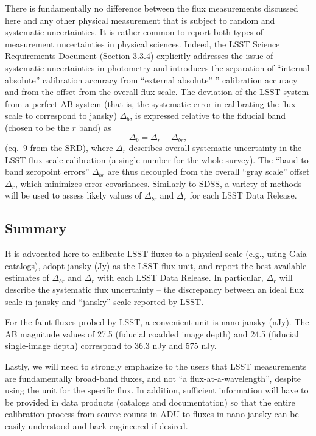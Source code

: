 \documentclass[PST,toc]{lsstdoc}
\begin{document}
There is fundamentally no difference between the flux measurements discussed
here and any other physical measurement that is subject to random and systematic
uncertainties. It is rather common to report both types of measurement uncertainties
in physical sciences. Indeed, the LSST  Science Requirements Document (Section 3.3.4)
explicitly addresses the issue of systematic uncertainties in photometry and
introduces the separation of ``internal absolute'' calibration accuracy
from ``external absolute'' ” calibration accuracy and from the offset from the
overall flux scale. The deviation of the LSST system from a perfect AB system
(that is, the systematic error in calibrating the flux scale to correspond to jansky)
$\Delta_b$, is expressed relative to the fiducial band (chosen to be the $r$ band)
as \begin{equation}
             \Delta_b = \Delta_r + \Delta_{br},
\end{equation}
(eq.~9 from the SRD), where $\Delta_r$ describes overall systematic uncertainty
in the LSST flux scale calibration (a single number for the whole survey). The
``band-to-band zeropoint errors'' $\Delta_{br}$ are thus decoupled from the overall
``gray scale'' offset $\Delta_{r}$, which minimizes error covariances. Similarly to SDSS,
a variety of methods will be used to assess likely values of $\Delta_{br}$ and
$\Delta_r$ for each LSST Data Release.


\subsection{Summary}

It is advocated here to calibrate LSST fluxes to a physical scale (e.g., using
Gaia catalogs), adopt jansky (Jy) as the LSST flux unit, and report the best available
estimates of $\Delta_{br}$ and $\Delta_r$ with each LSST Data Release. In particular,
$\Delta_r$ will describe the systematic flux uncertainty --  the discrepancy between an
ideal flux scale in jansky and ``jansky'' scale reported by LSST.

For the faint fluxes probed by LSST, a convenient unit is nano-jansky (nJy).
The AB magnitude values of 27.5 (fiducial coadded image depth)  and 24.5 (fiducial
single-image depth) correspond to 36.3 nJy and 575 nJy.

Lastly, we will need to strongly emphasize to the users that LSST measurements are
fundamentally broad-band fluxes, and not ``a flux-at-a-wavelength'', despite using the
unit for the specific flux. In addition, sufficient information will have to be provided
in data products (catalogs and documentation) so that the entire calibration process from
source counts in ADU to fluxes in nano-jansky can be easily understood and back-engineered
if desired.
\end{document}
